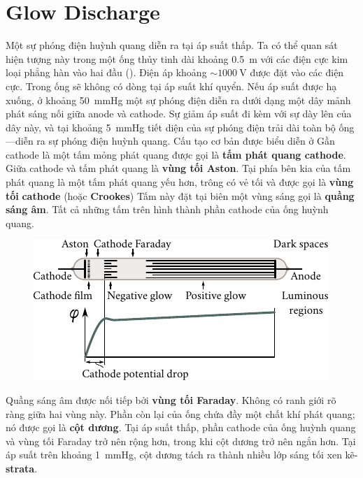 \section{Glow Discharge}\label{sec:12_6}

Một sự phóng điện huỳnh quang diễn ra tại áp suất thấp.
Ta có thể quan sát hiện tượng này trong một ống thủy tinh dài khoảng \SI{0.5}{\metre} với các điện cực kim loại phẳng hàn vào hai đầu ().
Điện áp khoảng $\sim\SI{1000}{\volt}$ được đặt vào các điện cực.
Trong ống sẽ không có dòng tại áp suất khí quyển.
Nếu áp suất được hạ xuống, ở khoảng \SI{50}{\mmHg} một sự phóng điện diễn ra dưới dạng một dây mảnh phát sáng nối giữa anode và cathode.
Sự giảm áp suất đi kèm với sự dày lên của dây này, và tại khoảng \SI{5}{\mmHg} tiết diện của sự phóng điện trải dài toàn bộ ống---diễn ra sự phóng điện huỳnh quang.
Cấu tạo cơ bản được biểu diễn ở 
Gần cathode là một tấm mỏng phát quang được gọi là \textbf{tấm phát quang cathode}.
Giữa cathode và tấm phát quang là \textbf{vùng tối Aston}.
Tại phía bên kia của tấm phát quang là một tấm phát quang yếu hơn, trông có vẻ tối và được gọi là \textbf{vùng tối} \textbf{cathode} (hoặc \textbf{Crookes})
Tấm này đặt tại biên một vùng sáng gọi là \textbf{quầng sáng âm}.
Tất cả những tấm trên hình thành phần cathode của ống huỳnh quang.

\begin{figure}[t]
	\begin{center}
		\includegraphics[scale=1]{figures/ch_12/fig_12_8.pdf}
		\caption[]{}
		\label{fig:12_8}
	\end{center}
	\vspace{-0.8cm}
\end{figure}

Quầng sáng âm được nối tiếp bởi \textbf{vùng tối Faraday}.
Không có ranh giới rõ ràng giữa hai vùng này.
Phần còn lại của ống chứa đầy một chất khí phát quang; nó được gọi là \textbf{cột dương}.
Tại áp suất thấp, phần cathode của ống huỳnh quang và vùng tối Faraday trở nên rộng hơn, trong khi cột dương trở nên ngắn hơn.
Tại áp suất trên khoảng \SI{1}{\mmHg}, cột dương tách ra thành nhiều lớp sáng tối xen kẽ-\textbf{strata}.


